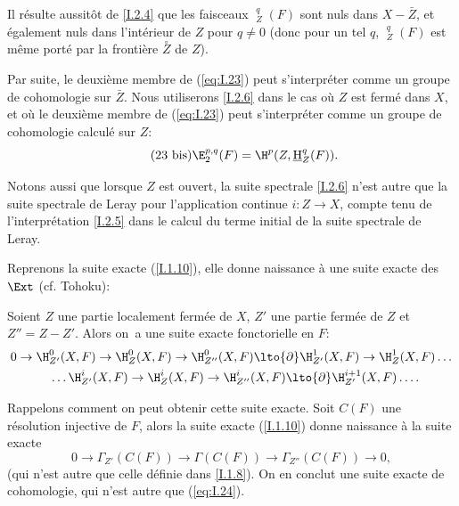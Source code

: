 \begin{remarques} \label{I.2.7} Il r\'esulte aussit\^{o}t de \ref{I.2.4} que les faisceaux $\mathop{\underline{\mathrm{H}}}\nolimits_Z^q(F)$ sont nuls dans $X-\bar{Z}$, et \'egalement nuls dans l'int\'erieur de $Z$ pour $q\neq 0$ (donc pour un tel $q$, $\mathop{\underline{\mathrm{H}}}\nolimits_Z^q(F)$ est m\^eme port\'e par la fronti\`ere $\overset{\circ}{Z}$ de $Z$).

Par suite, le deuxi\`eme membre de (\ref{eq:I.23}) peut s'interpr\'eter comme un groupe de cohomologie sur $\bar{Z}$. Nous utiliserons \ref{I.2.6} dans le cas o\`u $Z$ est ferm\'e dans $X$, et o\`u le deuxi\`eme membre de (\ref{eq:I.23}) peut s'interpr\'eter comme un groupe de cohomologie calcul\'e sur $Z$:
\begin{equation} \label{eq:I.23bis}\tag{23 bis} {\E_2^{p, q}(F) = \H^p(Z, \mathop{\underline{\mathrm{H}}}\nolimits_Z^q(F))}.
\end{equation}
\end{remarques}
\ignorespaces

Notons aussi que lorsque $Z$ est ouvert, la suite spectrale \ref{I.2.6} n'est autre que la suite spectrale de Leray pour l'application continue $i: Z \to X$, compte tenu de l'interpr\'etation \ref{I.2.5} dans le calcul du terme initial de la suite spectrale de Leray.

\bigskip Reprenons la suite exacte (\ref{I.1.10}), elle donne naissance \`a une suite exacte des $\Ext$ (cf. Tohoku):

\begin{theoreme} \label{I.2.8}
Soient $Z$ une partie localement ferm\'ee de $X$, $Z'$ une partie ferm\'ee de $Z$ et $Z''=Z-Z'$. Alors on~a une suite exacte fonctorielle en $F$:
\begin{equation} \label{eq:I.24}
\begin{gathered}
0 \to \H_{Z'}^0(X, F) \to \H_Z^0(X, F) \to \H_{Z''}^0(X, F)\lto{\partial} \H^1_{Z'}(X, F) \to \H^1_Z(X, F) \dots \\
\phantom{0}\dots \H_{Z'}^i(X, F) \to \H_Z^i(X, F) \to \H_{Z''}^i(X, F)\lto{\partial} \H^{i+1}_{Z'}(X, F)\dots.
\end{gathered}
\end{equation}
\end{theoreme}

Rappelons comment on peut obtenir cette suite exacte. Soit $C(F)$ une r\'esolution injective de $F$, alors la suite exacte (\ref{I.1.10}) donne naissance \`a la suite exacte
\begin{equation} \label{eq:I.25} {0 \to \Gamma_{Z'}(C(F)) \to \Gamma(C(F)) \to \Gamma_{Z''}(C(F)) \to 0},
\end{equation}
(qui n'est autre que celle d\'efinie dans \ref{I.1.8}). On en conclut une suite exacte de cohomologie, qui n'est autre que (\ref{eq:I.24}).

